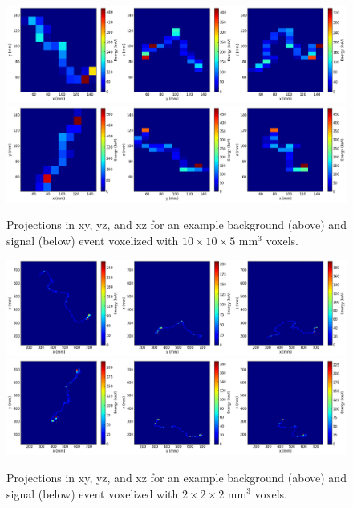 \documentclass[a4paper,11pt]{article}
\begin{document}
\begin{figure}[!htb]
	\centering
	\includegraphics[scale=0.36]{fig/plt_h2D_vox_dnn3d_NEXT100_Paolina10105_v10x10x5_r200x200x200_2_bg.png}
	\includegraphics[scale=0.36]{fig/plt_h2D_vox_dnn3d_NEXT100_Paolina10105_v10x10x5_r200x200x200_3_si.png}
	\caption{\label{fig.exampleProjs10105}Projections in xy, yz, and xz for an example background (above) and signal (below) event voxelized with $10 \times 10 \times 5$ mm$^3$ voxels.}
\end{figure}

\begin{figure}[!htb]
	\centering
	\includegraphics[scale=0.36]{fig/plt_h2D_vox_dnn3d_NEXT100_Paolina222_v2x2x2_r200x200x200_0_bg.png}
	\includegraphics[scale=0.36]{fig/plt_h2D_vox_dnn3d_NEXT100_Paolina222_v2x2x2_r200x200x200_2_si.png}
	\caption{\label{fig.exampleProjs222}Projections in xy, yz, and xz for an example background (above) and signal (below) event voxelized with $2 \times 2 \times 2$ mm$^3$ voxels.}
\end{figure}
\end{document}
